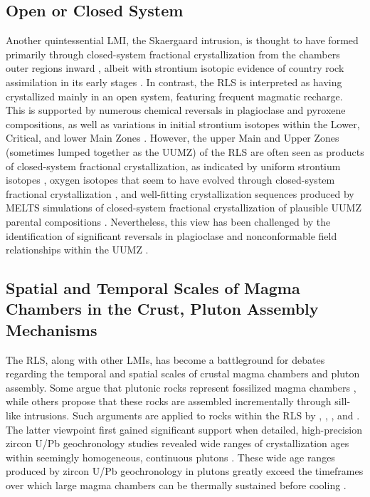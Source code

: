 \subsection{Open or Closed System}
\label{sec:ch5-open-or-closed-system}

Another quintessential LMI, the Skaergaard intrusion, is thought to have
formed primarily through closed-system fractional crystallization from
the chamber\textquotesingle s outer regions inward \citep{mcbirney1979},
albeit with strontium isotopic evidence of country rock
assimilation in its early stages \citep{stewart1990}. In
contrast, the RLS is interpreted as having crystallized mainly in an
open system, featuring frequent magmatic recharge. This is supported by
numerous chemical reversals in plagioclase and pyroxene compositions, as
well as variations in initial strontium isotopes within the Lower,
Critical, and lower Main Zones \citep{kruger1994,cawthorn2015}. However,
the upper Main and Upper Zones (sometimes lumped together as the UUMZ)
of the RLS are often seen as products of closed-system fractional
crystallization, as indicated by uniform strontium isotopes \citep{kruger1994},
oxygen isotopes that seem to have evolved through closed-system
fractional crystallization \citep{bucholz2017}, and well-fitting
crystallization sequences produced by MELTS simulations of closed-system
fractional crystallization of plausible UUMZ parental compositions
\citep{vantongeren2010}. Nevertheless, this view has been challenged
by the identification of significant reversals in plagioclase and
nonconformable field relationships within the UUMZ \citep{yuan2017,scoon2012}.

\subsection{Spatial and Temporal Scales of Magma Chambers in the Crust, Pluton Assembly Mechanisms}
\label{sec:ch5-magma-chamber-scales}

The RLS, along with other LMIs, has become a battleground for debates
regarding the temporal and spatial scales of crustal magma chambers and
pluton assembly. Some argue that plutonic rocks represent fossilized
magma chambers \citep{kruger2020,bachmann2004,paterson2009}, while others propose that these rocks are assembled
incrementally through sill-like intrusions. Such arguments are applied
to rocks within the RLS by \citet{mitchell2019}, \citet{yaoetal2021},
\citet{scoon2023}, and \citet{bourdeau2023}. The latter
viewpoint first gained significant support when detailed, high-precision
zircon U/Pb geochronology studies revealed wide ranges of
crystallization ages within seemingly homogeneous, continuous plutons
\citep{coleman2004,glazner2004}. These wide age ranges
produced by zircon U/Pb geochronology in plutons greatly exceed the
timeframes over which large magma chambers can be thermally sustained
before cooling \citep{annen2009,cawthornwalraven1998}.

